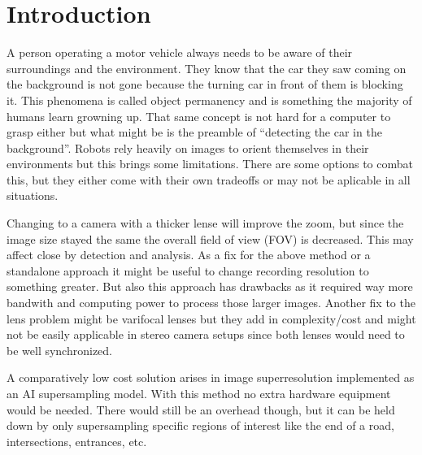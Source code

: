 \section*{Introduction}

A person operating a motor vehicle always needs to be aware of their surroundings and the environment. They know that the car they saw coming on the background is not gone because the turning car in front of them is blocking it.  This phenomena is called object permanency and is something the majority of humans learn growning up.
That same concept is not hard for a computer to grasp either but what might be is the preamble of \enquote{detecting the car in the background}. Robots rely heavily on images to orient themselves in their environments but this brings some limitations.
There are some options to combat this, but they either come with their own tradeoffs or may not be aplicable in all situations.

Changing to a camera with a thicker lense will improve the zoom, but since the image size stayed the same the overall field of view (FOV) is decreased. This may affect close by detection and analysis.
As a fix for the above method or a standalone approach it might be useful to change recording resolution to something greater. But also this approach has drawbacks as it required way more bandwith and computing power to process those larger images.
Another fix to the lens problem might be varifocal lenses but they add in complexity/cost and might not be easily applicable in stereo camera setups since both lenses would need to be well synchronized.

A comparatively low cost solution arises in image superresolution implemented as an AI supersampling model. With this method no extra hardware equipment would be needed.
There would still be an overhead though, but it can be held down by only supersampling specific regions of interest like the end of a road, intersections, entrances, etc.

